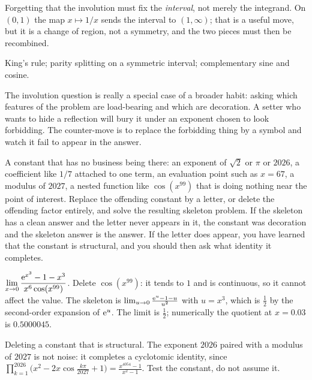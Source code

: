 \begin{trap}
Forgetting that the involution must fix the \emph{interval}, not merely the integrand. On $(0,1)$ the map $x\mapsto 1/x$ sends the interval to $(1,\infty)$; that is a useful move, but it is a change of region, not a symmetry, and the two pieces must then be recombined.
\end{trap}

\begin{seealsob}King's rule; parity splitting on a symmetric interval; complementary sine and cosine.\end{seealsob}

The involution question is really a special case of a broader habit: asking which features of the problem are load-bearing and which are decoration. A setter who wants to hide a reflection will bury it under an exponent chosen to look forbidding. The counter-move is to replace the forbidding thing by a symbol and watch it fail to appear in the answer.

\cue A constant that has no business being there: an exponent of $\sqrt{2}$ or $\pi$ or $2026$, a coefficient like $1/7$ attached to one term, an evaluation point such as $x=67$, a modulus of $2027$, a nested function like $\cos(x^{99})$ that is doing nothing near the point of interest.
\method Replace the offending constant by a letter, or delete the offending factor entirely, and solve the resulting skeleton problem. If the skeleton has a clean answer and the letter never appears in it, the constant was decoration and the skeleton answer is the answer. If the letter does appear, you have learned that the constant is structural, and you should then ask what identity it completes.

\begin{worked}
$\displaystyle\lim_{x\to 0}\frac{\mathrm{e}^{x^{3}}-1-x^{3}}{x^{6}\cos(x^{99})}$. Delete $\cos(x^{99})$: it tends to $1$ and is continuous, so it cannot affect the value. The skeleton is $\lim_{u\to 0}\frac{\mathrm{e}^{u}-1-u}{u^{2}}$ with $u=x^{3}$, which is $\tfrac12$ by the second-order expansion of $\mathrm{e}^{u}$. The limit is $\tfrac12$; numerically the quotient at $x=0.03$ is $0.5000045$.
\end{worked}

\begin{trap}
Deleting a constant that is structural. The exponent $2026$ paired with a modulus of $2027$ is not noise: it completes a cyclotomic identity, since $\prod_{k=1}^{2026}\bigl(x^{2}-2x\cos\tfrac{k\pi}{2027}+1\bigr)=\frac{x^{4054}-1}{x^{2}-1}$. Test the constant, do not assume it.
\end{trap}

